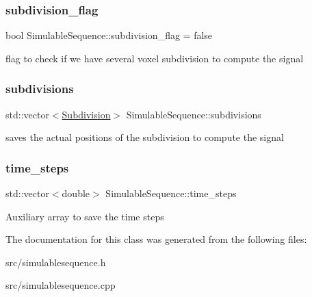 \subsubsection{\texorpdfstring{subdivision\+\_\+flag}{subdivision\_flag}}
{\footnotesize\ttfamily bool Simulable\+Sequence\+::subdivision\+\_\+flag = false}

flag to check if we have several voxel subdivision to compute the signal \mbox{\label{class_simulable_sequence_a77c721d4650578fdc3f44adfa91c030e}} 
\subsubsection{\texorpdfstring{subdivisions}{subdivisions}}
{\footnotesize\ttfamily std\+::vector$<$\hyperlink{class_subdivision}{Subdivision}$>$ Simulable\+Sequence\+::subdivisions}

saves the actual positions of the subdivision to compute the signal \mbox{\label{class_simulable_sequence_a7e7e1a0de6045046061ffccaba4fa5ee}} 
\subsubsection{\texorpdfstring{time\+\_\+steps}{time\_steps}}
{\footnotesize\ttfamily std\+::vector$<$double$>$ Simulable\+Sequence\+::time\+\_\+steps}

Auxiliary array to save the time steps 

The documentation for this class was generated from the following files\+:\begin{DoxyCompactItemize}
\item 
src/simulablesequence.\+h\item 
src/simulablesequence.\+cpp\end{DoxyCompactItemize}
